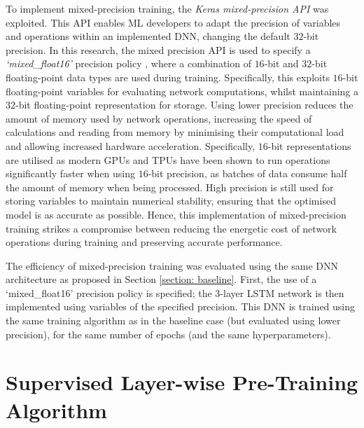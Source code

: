 \documentclass[a4paper, 11pt]{report}
\begin{document}
    To implement mixed-precision training, the \emph{Keras mixed-precision API} \citep{abadi-2016} was exploited. This API enables ML developers to adapt the precision of variables and operations within an implemented DNN, changing the default $32$-bit precision. In this research, the mixed precision API is used to specify a \emph{`mixed\_float16'} precision policy \citep{abadi-2016}, where a combination of $16$-bit and $32$-bit floating-point data types are used during training. Specifically, this exploits $16$-bit floating-point variables for evaluating network computations, whilst maintaining a $32$-bit floating-point representation for storage. Using lower precision reduces the amount of memory used by network operations, increasing the speed of calculations and reading from memory by minimising their computational load and allowing increased hardware acceleration. Specifically, $16$-bit representations are utilised as modern GPUs and TPUs have been shown to run operations significantly faster when using $16$-bit precision, as batches of data consume half the amount of memory when being processed. High precision is still used for storing variables to maintain numerical stability, ensuring that the optimised model is as accurate as possible. Hence, this implementation of mixed-precision training strikes a compromise between reducing the energetic cost of network operations during training and preserving accurate performance.

    The efficiency of mixed-precision training was evaluated using the same DNN architecture as proposed in Section \ref{section: baseline}. First, the use of a `mixed\_float16' precision policy is specified; the 3-layer LSTM network is then implemented using variables of the specified precision. This DNN is trained using the same training algorithm as in the baseline case (but evaluated using lower precision), for the same number of epochs (and the same hyperparameters).


    \section{Supervised Layer-wise Pre-Training Algorithm}
\end{document}
